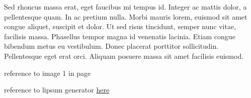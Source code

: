 \documentclass[a4paper, 12pt]{article}
\begin{document}
	Sed rhoncus massa erat, eget faucibus mi tempus id. Integer ac mattis dolor, a pellentesque quam. In ac pretium nulla. Morbi mauris lorem, euismod sit amet congue aliquet, suscipit et dolor. Ut sed risus tincidunt, semper nunc vitae, facilisis massa. Phasellus tempor magna id venenatis lacinia. Etiam congue bibendum metus eu vestibulum. Donec placerat porttitor sollicitudin. Pellentesque eget erat orci. Aliquam posuere massa sit amet facilisis euismod.
	
	reference to image 1 in page \pageref{fig:f1}
	
	reference to lipsum generator \href{https://www.lipsum.com/}{here}
\end{document}
